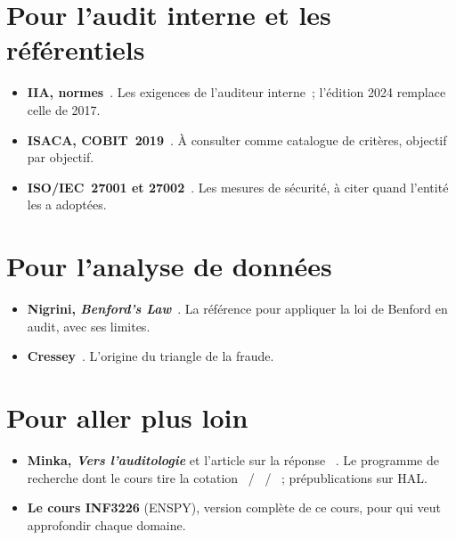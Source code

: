 \section*{Pour l'audit interne et les référentiels}

\begin{itemize}
    \item \textbf{IIA, normes}~\cite{iia2017cripp,iia2024gias}. Les
          exigences de l'auditeur interne~; l'édition 2024 remplace celle
          de 2017.
    \item \textbf{ISACA, COBIT~2019}~\cite{isaca2018cobitintro,isaca2018cobitobjectifs}.
          À consulter comme catalogue de critères, objectif par objectif.
    \item \textbf{ISO/IEC~27001 et 27002}~\cite{iso27001_2022,iso27002_2022}.
          Les mesures de sécurité, à citer quand l'entité les a adoptées.
\end{itemize}

\section*{Pour l'analyse de données}

\begin{itemize}
    \item \textbf{Nigrini, \emph{Benford's Law}}~\cite{nigrini2012benford}.
          La référence pour appliquer la loi de Benford en audit, avec ses
          limites.
    \item \textbf{Cressey}~\cite{cressey1953}. L'origine du triangle de la
          fraude.
\end{itemize}

\section*{Pour aller plus loin}

\begin{itemize}
    \item \textbf{Minka, \emph{Vers l'auditologie}} et l'article sur la
          réponse \NEK{}~\cite{minka2026auditologie,minka2026nek}. Le
          programme de recherche dont le cours tire la cotation
          \OUI{}~/ \NON{}~/ \NEK{}~; prépublications sur HAL.
    \item \textbf{Le cours INF3226} (ENSPY), version complète de ce cours,
          pour qui veut approfondir chaque domaine.
\end{itemize}

